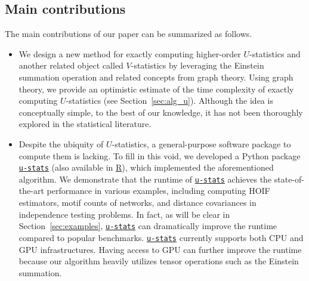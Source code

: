 \documentclass[12pt]{article}
\newcommand{\libref}[2]{\href{#2}{\texttt{#1}}}
\def\package{\libref{u-stats}{https://github.com/zrq1706/U-Statistics-Python}}
\theoremstyle{plain}
\theoremstyle{definition}
\newtheorem{remark}{Remark}
\def\package{\libref{u-stats}{https://github.com/zrq1706/U-Statistics-Python}}
\begin{document}
\begin{bibunit}[agsm]
\subsection*{Main contributions}


The main contributions of our paper can be summarized as follows.

\begin{itemize}
\item We design a new method for exactly computing higher-order $U$-statistics and another related object called $V$-statistics by leveraging the Einstein summation operation and related concepts from graph theory. Using graph theory, we provide an optimistic estimate of the time complexity of exactly computing $U$-statistics (see Section~\ref{sec:alg_u}). Although the idea is conceptually simple, to the best of our knowledge, it has not been thoroughly explored in the statistical literature.

\item Despite the ubiquity of $U$-statistics, a general-purpose software package to compute them is lacking. To fill in this void, we developed a Python package \package{} (also available in \href{https://github.com/cxy0714/U-Statistics-R}{R}), which implemented the aforementioned algorithm. We demonstrate that the runtime of \package{} achieves the state-of-the-art performance in various examples, including computing HOIF estimators, motif counts of networks, and distance covariances in independence testing problems. In fact, as will be clear in Section~\ref{sec:examples}, \package{} can dramatically improve the runtime compared to popular benchmarks. \package{} currently supports both CPU and GPU infrastructures. Having access to GPU can further improve the runtime because our algorithm heavily utilizes tensor operations such as the Einstein summation. %
\end{itemize}

\end{bibunit}
\end{document}
